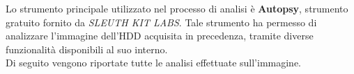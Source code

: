 Lo strumento principale utilizzato nel processo di analisi è \textbf{Autopsy}, strumento gratuito fornito da \textit{SLEUTH KIT LABS}. Tale strumento ha permesso di analizzare l'immagine dell'HDD acquisita in precedenza, tramite diverse funzionalità disponibili al suo interno.\vspace{14pt}\\
Di seguito vengono riportate tutte le analisi effettuate sull'immagine.